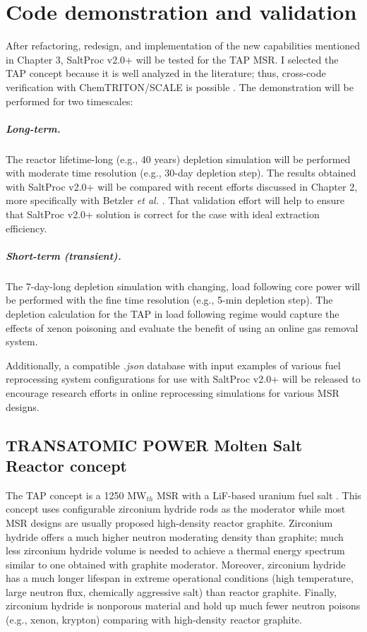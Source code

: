 \chapter[Code demonstration and validation]{Code demonstration and validation}

After refactoring, redesign, and implementation of the new capabilities 
mentioned in Chapter 3, SaltProc v2.0+ will be tested for the \gls{TAP} 
\gls{MSR}. I selected the \gls{TAP} concept because it is well analyzed in the 
literature; thus, cross-code verification with ChemTRITON/SCALE is possible 
\cite{betzler_assessment_2017}. The demonstration will be performed for two 
timescales:
\paragraph{Long-term.} The reactor lifetime-long (e.g., 40 years) depletion 
simulation will be performed with moderate time resolution (e.g., 30-day 
depletion step). The results obtained with SaltProc v2.0+ will be compared 
with recent efforts discussed in Chapter 2, more specifically with Betzler 
\emph{et al.}  \cite{betzler_assessment_2017}. That validation effort will 
help to ensure that SaltProc v2.0+ solution is correct for the case with ideal 
extraction efficiency.
\paragraph{Short-term (transient).} The 7-day-long depletion simulation with 
changing, load following core power will be performed with the fine time 
resolution (e.g., 5-min depletion step). The depletion calculation for the 
\gls{TAP} in load following regime would capture the effects of xenon 
poisoning and evaluate the benefit of using an online gas removal system.

Additionally, a compatible \textit{.json} database with input examples of 
various fuel reprocessing system configurations for use with SaltProc v2.0+ 
will be released to encourage research efforts in online reprocessing 
simulations for various \gls{MSR} designs.

\section{TRANSATOMIC POWER Molten Salt Reactor concept}
The \gls{TAP} concept is a 1250 MW$_{th}$ \gls{MSR} with a LiF-based uranium 
fuel salt \cite{transatomic_power_corporation_technical_2016}. This concept 
uses configurable zirconium hydride rods as the moderator while most \gls{MSR} 
designs are usually proposed high-density reactor graphite. Zirconium hydride 
offers a much higher neutron moderating density than graphite; much less 
zirconium hydride volume is needed to achieve a thermal energy spectrum 
similar to one obtained with graphite moderator. Moreover, zirconium hydride 
has a much longer lifespan in extreme operational conditions (high 
temperature, large neutron flux, chemically aggressive salt) than reactor 
graphite. Finally, zirconium hydride is nonporous material and hold up much 
fewer neutron poisons (e.g., xenon, krypton) comparing with high-density 
reactor graphite.

